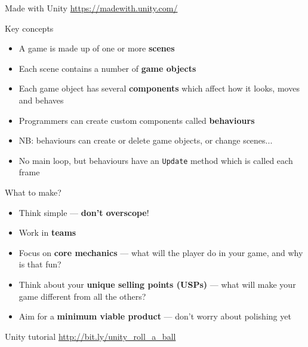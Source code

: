 \begin{frame}{Made with Unity}
	\center\url{https://madewith.unity.com/}
\end{frame}

\begin{frame}{Key concepts}
	\begin{itemize}
		\pause\item A game is made up of one or more \textbf{scenes}
		\pause\item Each scene contains a number of \textbf{game objects}
		\pause\item Each game object has several \textbf{components} which affect how it looks, moves and behaves
		\pause\item Programmers can create custom components called \textbf{behaviours}
		\pause\item NB: behaviours can create or delete game objects, or change scenes...
		\pause\item No main loop, but behaviours have an \lstinline{Update} method which is called each frame
	\end{itemize}
\end{frame}

\begin{frame}{What to make?}
	\begin{itemize}
		\pause\item Think simple --- \textbf{don't overscope}!
		\pause\item Work in \textbf{teams}
		\pause\item Focus on \textbf{core mechanics} --- what will the player do in your game, and why is that fun?
		\pause\item Think about your \textbf{unique selling points (USPs)} --- what will make your game different from all the others?
		\pause\item Aim for a \textbf{minimum viable product} --- don't worry about polishing yet
	\end{itemize}
\end{frame}

\begin{frame}{Unity tutorial}
	\center\url{http://bit.ly/unity_roll_a_ball}
\end{frame}


